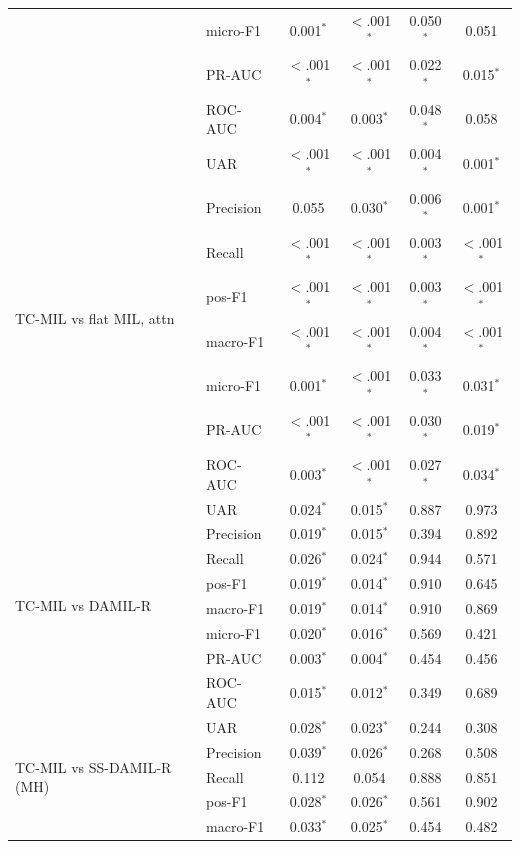 \documentclass[conference]{IEEEtran}
\begin{document}
\begin{table}[tp]
\begin{tabular}{@{}ll cc cc@{}}
 & micro-F1 & 0.001$^{*}$ & $<$.001$^{*}$ & 0.050$^{*}$ & 0.051 \\
 & PR-AUC & $<$.001$^{*}$ & $<$.001$^{*}$ & 0.022$^{*}$ & 0.015$^{*}$ \\
 & ROC-AUC & 0.004$^{*}$ & 0.003$^{*}$ & 0.048$^{*}$ & 0.058 \\
\midrule
\multirow{8}{*}{TC-MIL vs flat MIL, attn}
 & UAR & $<$.001$^{*}$ & $<$.001$^{*}$ & 0.004$^{*}$ & 0.001$^{*}$ \\
 & Precision & 0.055 & 0.030$^{*}$ & 0.006$^{*}$ & 0.001$^{*}$ \\
 & Recall & $<$.001$^{*}$ & $<$.001$^{*}$ & 0.003$^{*}$ & $<$.001$^{*}$ \\
 & pos-F1 & $<$.001$^{*}$ & $<$.001$^{*}$ & 0.003$^{*}$ & $<$.001$^{*}$ \\
 & macro-F1 & $<$.001$^{*}$ & $<$.001$^{*}$ & 0.004$^{*}$ & $<$.001$^{*}$ \\
 & micro-F1 & 0.001$^{*}$ & $<$.001$^{*}$ & 0.033$^{*}$ & 0.031$^{*}$ \\
 & PR-AUC & $<$.001$^{*}$ & $<$.001$^{*}$ & 0.030$^{*}$ & 0.019$^{*}$ \\
 & ROC-AUC & 0.003$^{*}$ & $<$.001$^{*}$ & 0.027$^{*}$ & 0.034$^{*}$ \\
\midrule
\multirow{8}{*}{TC-MIL vs DAMIL-R}
 & UAR & 0.024$^{*}$ & 0.015$^{*}$ & 0.887 & 0.973 \\
 & Precision & 0.019$^{*}$ & 0.015$^{*}$ & 0.394 & 0.892 \\
 & Recall & 0.026$^{*}$ & 0.024$^{*}$ & 0.944 & 0.571 \\
 & pos-F1 & 0.019$^{*}$ & 0.014$^{*}$ & 0.910 & 0.645 \\
 & macro-F1 & 0.019$^{*}$ & 0.014$^{*}$ & 0.910 & 0.869 \\
 & micro-F1 & 0.020$^{*}$ & 0.016$^{*}$ & 0.569 & 0.421 \\
 & PR-AUC & 0.003$^{*}$ & 0.004$^{*}$ & 0.454 & 0.456 \\
 & ROC-AUC & 0.015$^{*}$ & 0.012$^{*}$ & 0.349 & 0.689 \\
\midrule
\multirow{8}{*}{TC-MIL vs SS-DAMIL-R (MH)}
 & UAR & 0.028$^{*}$ & 0.023$^{*}$ & 0.244 & 0.308 \\
 & Precision & 0.039$^{*}$ & 0.026$^{*}$ & 0.268 & 0.508 \\
 & Recall & 0.112 & 0.054 & 0.888 & 0.851 \\
 & pos-F1 & 0.028$^{*}$ & 0.026$^{*}$ & 0.561 & 0.902 \\
 & macro-F1 & 0.033$^{*}$ & 0.025$^{*}$ & 0.454 & 0.482 \\

\end{tabular}
\end{table}
\end{document}
